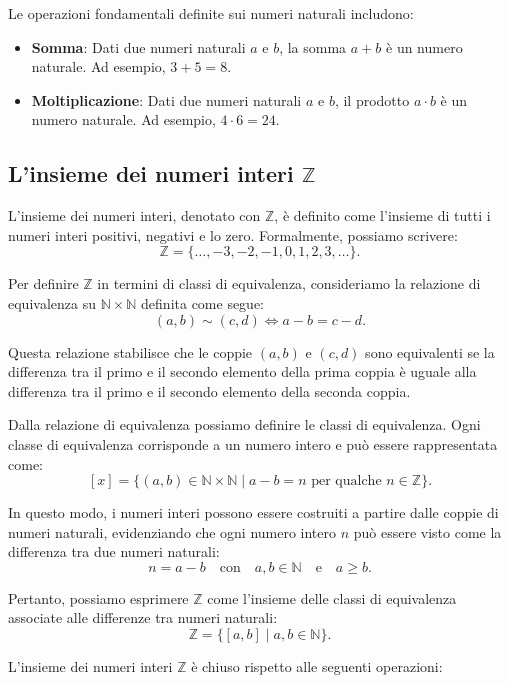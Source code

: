 \documentclass[a4paper,12pt]{article}
\begin{document}
Le operazioni fondamentali definite sui numeri naturali includono:

\begin{itemize}
	\item \textbf{Somma}: Dati due numeri naturali \( a \) e \( b \), la somma \( a + b \) è un numero naturale. Ad esempio, \( 3 + 5 = 8 \).
	\item \textbf{Moltiplicazione}: Dati due numeri naturali \( a \) e \( b \), il prodotto \( a \cdot b \) è un numero naturale. Ad esempio, \( 4 \cdot 6 = 24 \).
\end{itemize}

\subsection{L'insieme dei numeri interi \(\mathbb{Z}\)}
L'insieme dei numeri interi, denotato con \(\mathbb{Z}\), è definito come l'insieme di tutti i numeri interi positivi, negativi e lo zero. Formalmente, possiamo scrivere:
\[
	\mathbb{Z} = \{ \ldots, -3, -2, -1, 0, 1, 2, 3, \ldots \}.
\]

Per definire \(\mathbb{Z}\) in termini di classi di equivalenza, consideriamo la relazione di equivalenza su \(\mathbb{N} \times \mathbb{N}\) definita come segue:
\[
	(a, b) \sim (c, d) \iff a - b = c - d.
\]

Questa relazione stabilisce che le coppie \((a, b)\) e \((c, d)\) sono equivalenti se la differenza tra il primo e il secondo elemento della prima coppia è uguale alla differenza tra il primo e il secondo elemento della seconda coppia.

Dalla relazione di equivalenza possiamo definire le classi di equivalenza. Ogni classe di equivalenza corrisponde a un numero intero e può essere rappresentata come:
\[
	[x] = \{ (a, b) \in \mathbb{N} \times \mathbb{N} \mid a - b = n \text{ per qualche } n \in \mathbb{Z} \}.
\]

In questo modo, i numeri interi possono essere costruiti a partire dalle coppie di numeri naturali, evidenziando che ogni numero intero \( n \) può essere visto come la differenza tra due numeri naturali:
\[
	n = a - b \quad \text{con} \quad a, b \in \mathbb{N} \quad \text{e} \quad a \geq b.
\]

Pertanto, possiamo esprimere \(\mathbb{Z}\) come l'insieme delle classi di equivalenza associate alle differenze tra numeri naturali:
\[
	\mathbb{Z} = \{ [a, b] \mid a, b \in \mathbb{N} \}.
\]

L'insieme dei numeri interi \(\mathbb{Z}\) è chiuso rispetto alle seguenti operazioni:
\end{document}
